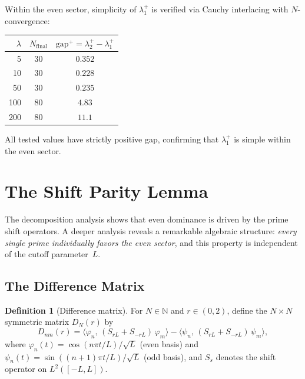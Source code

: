 \documentclass[12pt,a4paper]{article}
\theoremstyle{definition}
\newtheorem{definition}[theorem]{Definition}
\theoremstyle{remark}
\begin{document}
Within the even sector, simplicity of $\lambda_1^+$ is verified via Cauchy interlacing with $N$-convergence:

\begin{center}
\renewcommand{\arraystretch}{1.2}
\begin{tabular}{r|c|c}
$\lambda$ & $N_{\mathrm{final}}$ & $\mathrm{gap}^+ = \lambda_2^+ - \lambda_1^+$ \\\hline
5 & 30 & $0.352$ \\
10 & 30 & $0.228$ \\
50 & 30 & $0.235$ \\
100 & 80 & $4.83$ \\
200 & 80 & $11.1$ \\
\end{tabular}
\end{center}

\noindent All tested values have strictly positive gap, confirming that $\lambda_1^+$ is simple within the even sector.


\section{The Shift Parity Lemma}
\label{sec:shift-parity}

The decomposition analysis shows that even dominance is driven by the prime shift operators. A deeper analysis reveals a remarkable algebraic structure: \emph{every single prime individually favors the even sector}, and this property is independent of the cutoff parameter~$L$.

\subsection{The Difference Matrix}

\begin{definition}[Difference matrix]
\label{def:D-matrix}
For $N \in \mathbb{N}$ and $r \in (0,2)$, define the $N \times N$ symmetric matrix $D_N(r)$ by
\[
  D_{nm}(r) = \langle \varphi_n,\, (S_{rL} + S_{-rL})\,\varphi_m \rangle
            - \langle \psi_n,\, (S_{rL} + S_{-rL})\,\psi_m \rangle,
\]
where $\varphi_n(t) = \cos(n\pi t/L)/\sqrt{L}$ (even basis) and $\psi_n(t) = \sin((n+1)\pi t/L)/\sqrt{L}$ (odd basis), and $S_s$ denotes the shift operator on $L^2([-L,L])$.
\end{definition}
\end{document}
